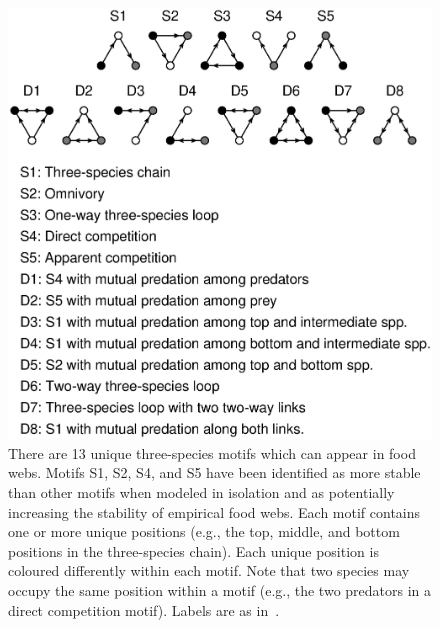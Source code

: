 \documentclass[12pt]{article}
\begin{document}
	\begin{figure}[hb!]
		\caption{There are 13 unique three-species motifs which can appear in food webs. Motifs S1, S2, S4, and S5 have been identified as more stable than other motifs when modeled in isolation and as potentially increasing the stability of empirical food webs. Each motif contains one or more unique positions (e.g., the top, middle, and bottom positions in the three-species chain). Each unique position is coloured differently within each motif. Note that two species may occupy the same position within a motif (e.g., the two predators in a direct competition motif). Labels are as in~\citet{Stouffer2007}.}
		\label{motifs}
		\includegraphics[width=.8\textwidth]{figures/motifs.eps}
		\end{figure}

\clearpage

     
\end{document}
